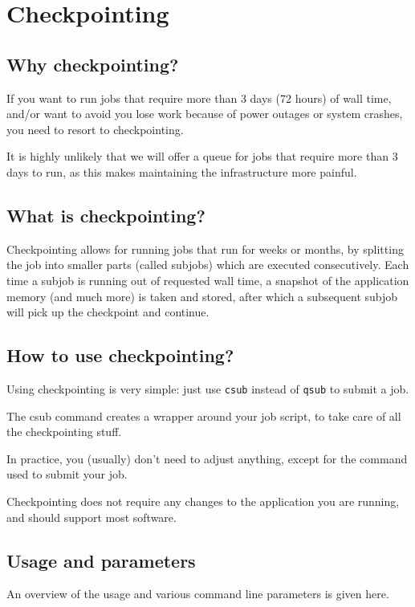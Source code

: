 \chapter{Checkpointing}
\label{ch:checkpointing}
\section{Why checkpointing?}
If you want to run jobs that require more than 3 days (72 hours) of wall time,
and/or want to avoid you lose work because of power outages or system crashes,
you need to resort to checkpointing.

It is highly unlikely that we will offer a queue for jobs that require more
than 3 days to run, as this makes maintaining the infrastructure more painful.


\section{What is checkpointing?}

Checkpointing allows for running jobs that run for weeks or months, by splitting
the job into smaller parts (called subjobs) which are executed consecutively.
Each time a subjob is running out of requested wall time, a snapshot of the
application memory (and much more) is taken and stored, after which a subsequent
subjob will pick up the checkpoint and continue.

\section{How to use checkpointing?}

Using checkpointing is very simple: just use \lstinline|csub| instead of \lstinline|qsub| to submit a job.

The csub command creates a wrapper around your job script, to take care
of all the checkpointing stuff.

In practice, you (usually) don't need to adjust anything, except for the command used to submit your job.

Checkpointing does not require any changes to the application you are running, and should support most software.

\section{Usage and parameters}

An overview of the usage and various command line parameters is given here.

